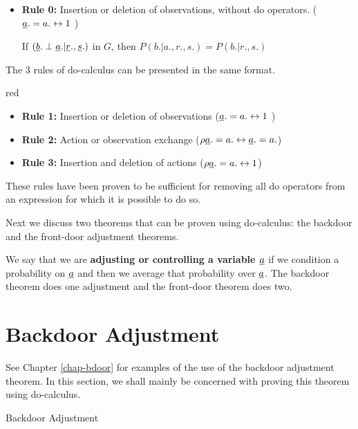 \begin{itemize}
\item {\bf Rule 0:} Insertion or
 deletion of
 observations, without
do operators.
(${\underline{a}}.=a. \leftrightarrow 1$ )


If 
 $({\underline{b}}.\perp {\underline{a}}.|{\underline{r}}., 
{\underline{s}}.)$ in $G$, then 
$P(b.|a., r., s.)=P(b.|r., s.)$
\end{itemize}

The 3 rules of do-calculus
can be presented in the same
format. 


\begin{color}{red}
\begin{itemize}
\item {\bf Rule 1:} 
Insertion or deletion of
 observations 
(${\underline{a}}.=a. \leftrightarrow 1$ )


\item {\bf Rule 2:} Action or 
observation exchange 
($\rho {\underline{a}}.=a. \leftrightarrow {\underline{a}}.=a.$)


\item {\bf Rule 3:} Insertion and
 deletion of actions
($\rho {\underline{a}}.=a. \leftrightarrow 1$)



\end{itemize}
\end{color}

These rules have been
proven to be 
sufficient
for removing
all do operators
from an expression
for 
which it 
is possible to do so.

Next we discuss
two theorems that can be
proven using
do-calculus:
the backdoor and the
front-door
adjustment theorems.

We say that 
we are {\bf adjusting 
or controlling a variable ${\underline{a}}$}
if we condition 
a probability on ${\underline{a}}$ and 
then we average 
that probability over ${\underline{a}}$.
The 
backdoor theorem does
one adjustment
and the 
front-door theorem does two.


\section*{Backdoor Adjustment}

See Chapter \ref{chap-bdoor}
for examples of the use of the 
backdoor adjustment theorem.
In this section,
we shall mainly be
concerned with
proving this
theorem
using do-calculus.



\bdoordef
\begin{claim} Backdoor Adjustment

\bdoorclaim
\end{claim}
\proof

